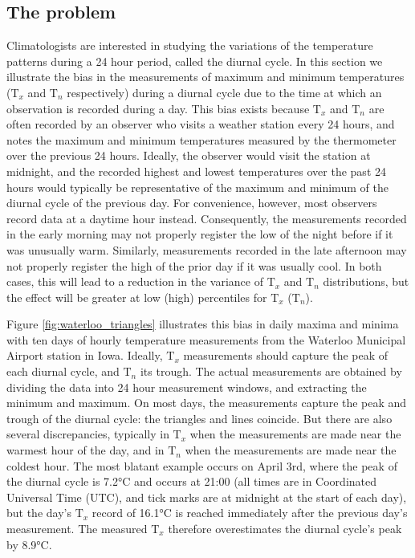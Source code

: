 \documentclass[letter]{article}
\newcommand{\T}{\mathrm{T}}
\newcommand{\Tn}{\T_{n}}
\newcommand{\Tx}{\T_{x}}
\begin{document}
\subsection{The problem} 
\label{sec:illustrate_bias}
Climatologists are interested in studying the variations of the temperature patterns during a 24 hour period, called the diurnal cycle. In this section we illustrate the bias in the measurements of maximum and minimum temperatures ($\Tx$ and $\Tn$ respectively) during a diurnal cycle due to the time at which an observation is recorded during a day.  This bias exists because $\Tx$ and $\Tn$ are often recorded by an observer who visits a weather station every 24 hours, and notes the maximum and minimum temperatures measured by the thermometer over the previous 24 hours.
Ideally, the observer would visit the station at midnight, and the recorded highest and lowest temperatures over the past 24 hours would typically be representative of the maximum and minimum of the diurnal cycle of the previous day.
For convenience, however, most observers record data at a daytime hour instead.
Consequently, the measurements recorded in the early morning may not properly register the low of the night before if it was unusually warm. Similarly, measurements recorded in the late afternoon may not properly register the high of the prior day if it was usually cool. In both cases, this will lead to a reduction in the variance of $\Tx$ and $\Tn$ distributions, but the effect will be greater at low (high) percentiles for $\Tx$ ($\Tn$). 

       Figure \ref{fig:waterloo_triangles} illustrates this bias in daily maxima and minima with ten days of hourly temperature measurements from the Waterloo Municipal Airport station in Iowa.
Ideally, \(\Tx\) measurements should capture the peak of each diurnal cycle, and \(\Tn\) its trough.
The actual measurements are obtained by dividing the data into 24 hour measurement windows, and extracting the minimum and maximum.
On most days, the measurements capture the peak and trough of the diurnal cycle: the triangles and lines coincide.
But there are also several discrepancies, typically in \(\Tx\) when the measurements are made near the warmest hour of the day, and in \(\Tn\) when the measurements are made near the coldest hour.
The most blatant example occurs on April 3rd,
where the peak of the diurnal cycle is 7.2°C and occurs at 21:00 (all times are in Coordinated Universal Time (UTC), and tick marks are at midnight at the start of each day), but the day's \(\Tx\) record of 16.1°C is reached immediately after the previous day's measurement.
The measured \(\Tx\) therefore overestimates the diurnal cycle's peak by 8.9°C.
  
\end{document}
